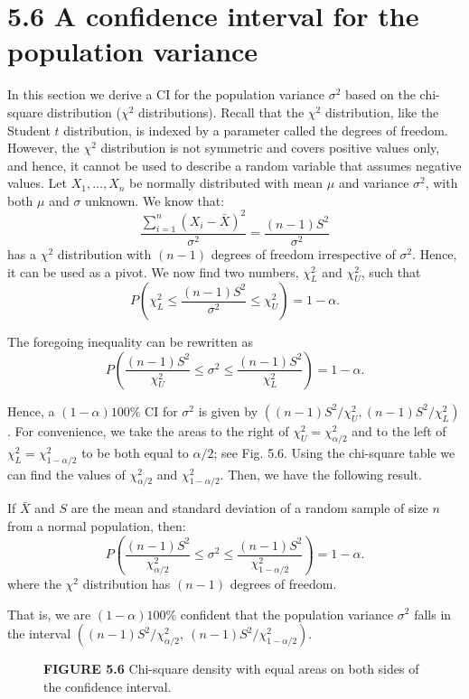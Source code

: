 \section*{5.6 A confidence interval for the population variance}

In this section we derive a CI for the population variance $\sigma^2$ based on the chi-square distribution ($\chi^2$ distributions). Recall that the $\chi^2$ distribution, like the Student $t$ distribution, is indexed by a parameter called the degrees of freedom. However, the $\chi^2$ distribution is not symmetric and covers positive values only, and hence, it cannot be used to describe a random variable that assumes negative values. Let $X_1, \ldots, X_n$ be normally distributed with mean $\mu$ and variance $\sigma^2$, with both $\mu$ and $\sigma$ unknown. We know that:
\[
\frac{\sum_{i=1}^{n}(X_i - \bar{X})^2}{\sigma^2} = \frac{(n-1)S^2}{\sigma^2}
\]
has a $\chi^2$ distribution with $(n-1)$ degrees of freedom irrespective of $\sigma^2$. Hence, it can be used as a pivot. We now find two numbers, $\chi^2_L$ and $\chi^2_U$, such that
\[
P\left(\chi^2_L \leq \frac{(n-1)S^2}{\sigma^2} \leq \chi^2_U\right) = 1 - \alpha.
\]

The foregoing inequality can be rewritten as
\[
P\left(\frac{(n-1)S^2}{\chi^2_U} \leq \sigma^2 \leq \frac{(n-1)S^2}{\chi^2_L}\right) = 1 - \alpha.
\]

Hence, a $(1-\alpha)100\%$ CI for $\sigma^2$ is given by $\left((n-1)S^2/\chi^2_U, (n-1)S^2/\chi^2_L\right)$. For convenience, we take the areas to the right of $\chi^2_U = \chi^2_{\alpha/2}$ and to the left of $\chi^2_L = \chi^2_{1-\alpha/2}$ to be both equal to $\alpha/2$; see Fig. 5.6. Using the chi-square table we can find the values of $\chi^2_{\alpha/2}$ and $\chi^2_{1-\alpha/2}$. Then, we have the following result.

\begin{theorem}[5.6.1]
If $\bar{X}$ and $S$ are the mean and standard deviation of a random sample of size $n$ from a normal population, then:
\[
P\left(\frac{(n-1)S^2}{\chi^2_{\alpha/2}} \leq \sigma^2 \leq \frac{(n-1)S^2}{\chi^2_{1-\alpha/2}}\right) = 1 - \alpha.
\]
where the $\chi^2$ distribution has $(n-1)$ degrees of freedom.

That is, we are $(1-\alpha)100\%$ confident that the population variance $\sigma^2$ falls in the interval $\left((n-1)S^2 / \chi^2_{\alpha/2}, \ (n-1)S^2 / \chi^2_{1-\alpha/2}\right)$.
\end{theorem}

\begin{figure}[h]
\centering
{}
\caption*{\textbf{FIGURE 5.6} Chi-square density with equal areas on both sides of the confidence interval.}
\end{figure}

